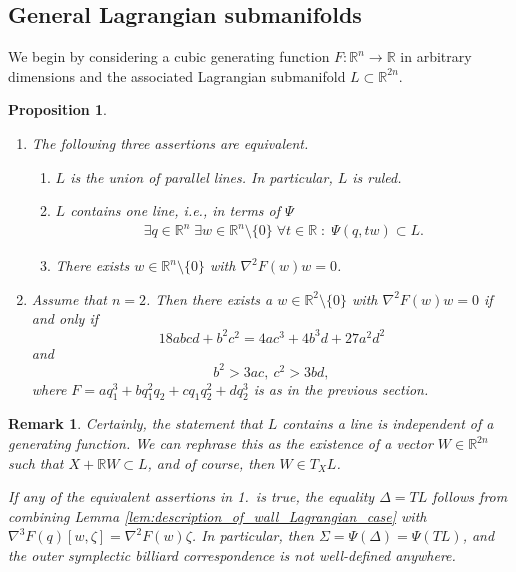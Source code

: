 \documentclass[12pt]{article}
\newtheorem{proposition}[lemma]{Proposition}
\newtheorem{remark}[lemma]{Remark}
\newcommand{\R}{{\mathbb R}}
\begin{document}
\subsection{General Lagrangian submanifolds}

We begin by considering a cubic generating function $F:\R^n\to\R$ in arbitrary dimensions and the associated Lagrangian submanifold $L\subset\R^{2n}$.

\begin{proposition}\label{prop:ruled_means_nabla_F_w_w_0}$ $
\begin{enumerate}  %
\item The following three assertions are equivalent. 
\begin{enumerate}  %
\item $L$ is the union of parallel lines. In particular, $L$ is ruled.
\item $L$ contains one line, i.e., in terms of $\Psi$
	\begin{equation}\nonumber
	\begin{aligned}
	\exists q\in\R^n\;\exists w\in\R^n\setminus\{0\}\;\forall t\in\R\;:\; \Psi(q,tw)\subset L.
	\end{aligned}
	\end{equation}  
\item There exists $w\in\R^n\setminus\{0\}$ with $\nabla^2F(w)w=0$.
\end{enumerate}
%
\item Assume that $n=2$. Then there exists a $w\in\R^2\setminus\{0\}$ with $\nabla^2F(w)w=0$ if and only if
\begin{equation}\nonumber%
18abcd+b^2c^2=4ac^3+4b^3d+27a^2d^2
\end{equation}
and
$$
b^2>3ac,\ c^2>3bd,
$$
where $F=aq_1^3+bq_1^2q_2+cq_1q_2^2+dq_2^3$ is as in the previous section.
\end{enumerate}
\end{proposition}

\begin{remark}
{\rm
Certainly, the statement that $L$ contains a line is independent of a generating function. We can rephrase this as the existence of a vector $W\in\R^{2n}$ such that $X+\R W\subset L$, and of course, then $W\in T_XL$.

If any of the equivalent assertions in 1.~is true, the equality $\Delta=TL$ follows from combining Lemma \ref{lem:description_of_wall_Lagrangian_case} with $\nabla^3F(q)[w,\zeta]=\nabla^2F(w)\zeta$. In particular, then $\Sigma=\Psi(\Delta)=\Psi(TL)$, and the outer symplectic billiard correspondence is not well-defined anywhere.
} 
\end{remark}
\end{document}
